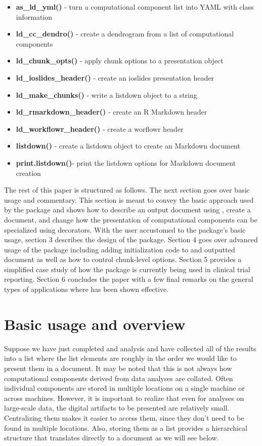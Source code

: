 \documentclass[
]{jss}
\begin{document}
\begin{itemize}
\item{\bf as\_ld\_yml() }{- turn a computational component list into YAML with class information}
\item{\bf ld\_cc\_dendro() }{- create a dendrogram from a list of computational components}
\item{\bf ld\_chunk\_opts() }{- apply chunk options to a presentation object}
\item{\bf ld\_ioslides\_header() }{- create an ioslides presentation header}
\item{\bf ld\_make\_chunks() }{- write a listdown object to a string}
\item{\bf ld\_rmarkdown\_header() }{- create an R Markdown header}
\item{\bf ld\_workflowr\_header() }{- create a worflowr header}
\item{\bf listdown() }{- create a listdown object to create an  Markdown document}
\item{\bf print.listdown()}{- print the listdown options for  Markdown document creation}
\end{itemize}

The rest of this paper is structured as follows. The next section goes
over basic usage and commentary. This section is meant to convey the
basic approach used by the package and shows how to describe an output
document using , create a document, and change how the
presentation of computational components can be specialized using
 decorators. With the user accustomed to the package's
basic usage, section 3 describes the design of the package. Section 4
goes over advanced usage of the package including adding initialization
code to and outputted document as well as how to control chunk-level
options. Section 5 provides a simplified case study of how the package
is currently being used in clinical trial reporting. Section 6 concludes
the paper with a few final remarks on the general types of applications
where  has been shown effective.

\hypertarget{basic-usage-and-overview}{%
\section{Basic usage and overview}\label{basic-usage-and-overview}}

Suppose we have just completed and analysis and have collected all of
the results into a list where the list elements are roughly in the order
we would like to present them in a document. It may be noted that this
is not always how computational components derived from data analyses
are collated. Often individual components are stored in multiple
locations on a single machine or across machines. However, it is
important to realize that even for analyses on large-scale data, the
digital artifacts to be presented are relatively small. Centralizing
them makes it easier to access them, since they don't need to be found
in multiple locations. Also, storing them as a list provides a
hierarchical structure that translates directly to a document as we will
see below.
\end{document}
